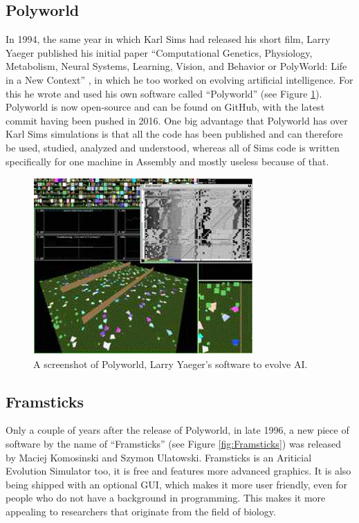 \documentclass[12pt,oneside,listof=totoc,paper=a4,headings=small]{scrbook}
\begin{document}
\subsection{Polyworld}
In 1994, the same year in which Karl Sims had released his short film, Larry Yaeger published his initial paper ``Computational Genetics, Physiology, Metabolism, Neural Systems, Learning, Vision, and Behavior or PolyWorld: Life in a New Context'' \cite{yaeger1994computational}, in which he too worked on evolving artificial intelligence. For this he wrote and used his own software called ``Polyworld'' (see Figure \ref{fig:Polyworld}). Polyworld is now open-source and can be found on GitHub, with the latest commit having been pushed in 2016. 
One big advantage that Polyworld has over Karl Sims simulations is that all the code has been published and can therefore be used, studied, analyzed and understood, whereas all of Sims code is written specifically for one machine in Assembly and mostly useless because of that.
\begin{figure}[h!]
\centering
\includegraphics[width=0.75\textwidth,height=0.75\textheight,keepaspectratio]{images/image001.png}
\caption{A screenshot of Polyworld, Larry Yaeger's software to evolve AI.~\cite{polypicture}}
\label{fig:Polyworld}
\end{figure}


\newpage

\subsection{Framsticks}
Only a couple of years after the release of Polyworld, in late 1996, a new piece of software by the name of ``Framsticks'' (see Figure \ref{fig:Framsticks}) \cite{komosinski1999framsticks} was released by Maciej Komosinski and Szymon Ulatowski. Framsticks is an Ariticial Evolution Simulator too, it is free and features more advanced graphics. It is also being shipped with an optional GUI, which makes it more user friendly, even for people who do not have a background in programming. This makes it more appealing to researchers that originate from the field of biology.
\end{document}
